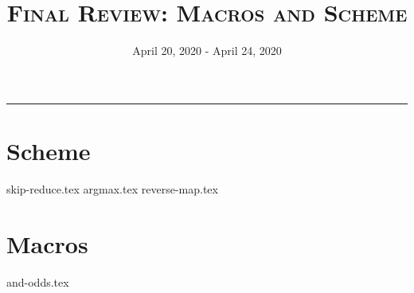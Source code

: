 \documentclass{exam}
\title{\textsc{Final Review: Macros and Scheme}}
\date{April 20, 2020 - April 24, 2020}
\begin{document}
\maketitle\rule{\textwidth}{0.15em}
\fontsize{12}{15}\selectfont

\section{Scheme}
\begin{questions}
{skip-reduce.tex}
\newpage
{argmax.tex}
\newpage
{reverse-map.tex}
\end{questions}
\newpage

\section{Macros}
\begin{questions}
{and-odds.tex}
\end{questions}
\end{document}
